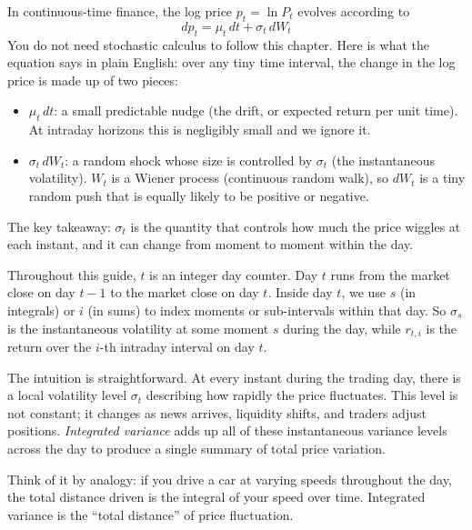 \begin{prereq}
In continuous-time finance, the log price $p_t = \ln P_t$ evolves according to
\[
  dp_t = \mu_t\,dt + \sigma_t\,dW_t
\]
You do not need stochastic calculus to follow this chapter.
Here is what the equation says in plain English: over any tiny time interval, the change in the log price is made up of two pieces:
\begin{itemize}[nosep]
  \item $\mu_t\,dt$: a small predictable nudge (the drift, or expected return per unit time). At intraday horizons this is negligibly small and we ignore it.
  \item $\sigma_t\,dW_t$: a random shock whose size is controlled by $\sigma_t$ (the instantaneous volatility). $W_t$ is a Wiener process (continuous random walk), so $dW_t$ is a tiny random push that is equally likely to be positive or negative.
\end{itemize}
The key takeaway: $\sigma_t$ is the quantity that controls how much the price wiggles at each instant, and it can change from moment to moment within the day.
\end{prereq}

\begin{prereq}
Throughout this guide, $t$ is an integer day counter.
Day $t$ runs from the market close on day $t-1$ to the market close on day $t$.
Inside day $t$, we use $s$ (in integrals) or $i$ (in sums) to index moments or sub-intervals within that day.
So $\sigma_s$ is the instantaneous volatility at some moment $s$ during the day, while $r_{t,i}$ is the return over the $i$-th intraday interval on day $t$.
\end{prereq}

The intuition is straightforward.
At every instant during the trading day, there is a local volatility level $\sigma_t$ describing how rapidly the price fluctuates.
This level is not constant; it changes as news arrives, liquidity shifts, and traders adjust positions.
\emph{Integrated variance} adds up all of these instantaneous variance levels across the day to produce a single summary of total price variation.

Think of it by analogy: if you drive a car at varying speeds throughout the day, the total distance driven is the integral of your speed over time.
Integrated variance is the ``total distance'' of price fluctuation.

